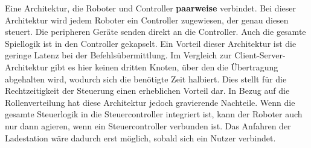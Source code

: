Eine Architektur, die Roboter und Controller \textbf{paarweise} verbindet. Bei dieser Architektur wird jedem Roboter ein Controller zugewiesen, der genau diesen steuert. Die peripheren Geräte senden direkt an die Controller. Auch die gesamte Spiellogik ist in den Controller gekapselt. Ein Vorteil dieser Architektur ist die geringe Latenz bei der Befehlsübermittlung. Im Vergleich zur Client-Server-Architektur gibt es hier keinen dritten Knoten, über den die Übertragung abgehalten wird, wodurch sich die benötigte Zeit halbiert. Dies stellt für die Rechtzeitigkeit der Steuerung einen erheblichen Vorteil dar. In Bezug auf die Rollenverteilung hat diese Architektur jedoch gravierende Nachteile. Wenn die gesamte Steuerlogik in die Steuercontroller integriert ist, kann der Roboter auch nur dann agieren, wenn ein Steuercontroller verbunden ist. Das Anfahren der Ladestation wäre dadurch erst möglich, sobald sich ein Nutzer verbindet.

\vspace{1cm}

